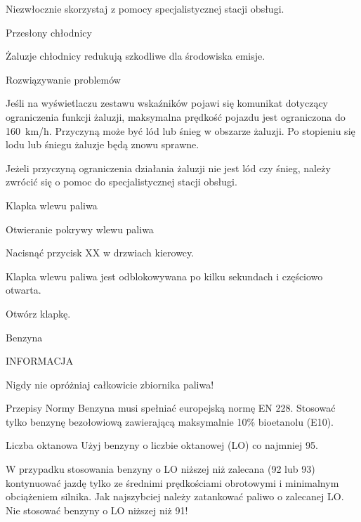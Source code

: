 \begin{itemizeArrow}
	\itemArrow Niezwłocznie skorzystaj z pomocy specjalistycznej stacji obsługi.
\end{itemizeArrow}

Przesłony chłodnicy

Żaluzje chłodnicy redukują szkodliwe dla środowiska emisje.

Rozwiązywanie problemów

Jeśli na wyświetlaczu zestawu wskaźników pojawi się komunikat dotyczący ograniczenia funkcji żaluzji, maksymalna prędkość pojazdu jest ograniczona do 160~km/h.
Przyczyną może być lód lub śnieg w obszarze żaluzji.
Po stopieniu się lodu lub śniegu żaluzje będą znowu sprawne.
\begin{itemizeArrow}
	\itemArrow Jeżeli przyczyną ograniczenia działania żaluzji nie jest lód czy śnieg, należy zwrócić się o pomoc do specjalistycznej stacji obsługi.
\end{itemizeArrow}

Klapka wlewu paliwa

Otwieranie pokrywy wlewu paliwa

\begin{itemizeArrow}
	\itemArrow Nacisnąć przycisk XX w drzwiach kierowcy.
\end{itemizeArrow}
Klapka wlewu paliwa jest odblokowywana po kilku sekundach i częściowo otwarta.
\begin{itemizeArrow}
	\itemArrow Otwórz klapkę.
\end{itemizeArrow}

Benzyna

INFORMACJA
\begin{itemizeTriangle}
	\itemTriangle Nigdy nie opróżniaj całkowicie zbiornika paliwa!
\end{itemizeTriangle}

Przepisy
Normy
Benzyna musi spełniać europejską normę EN 228.
Stosować tylko benzynę bezołowiową zawierającą maksymalnie 10\% bioetanolu (E10).

Liczba oktanowa
Użyj benzyny o liczbie oktanowej (LO) co najmniej 95.

\begin{itemizeTriangle}
	\itemTriangle W przypadku stosowania benzyny o LO niższej niż zalecana (92 lub 93) kontynuować jazdę tylko ze średnimi prędkościami obrotowymi i minimalnym obciążeniem silnika.
	\itemTriangle Jak najszybciej należy zatankować paliwo o zalecanej LO.
	\itemTriangle Nie stosować benzyny o LO niższej niż 91!
\end{itemizeTriangle}


